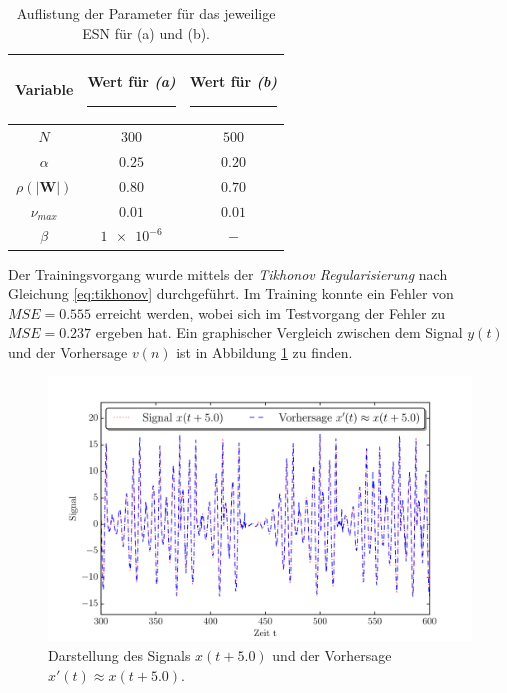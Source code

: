 \begin{table}[H]
	\centering
	\captionsetup{width=0.9\linewidth}
		\begin{tabular}{|c|c|c|}
		\rule[-1ex]{0pt}{3.5ex} Variable & \hspace{4ex} Wert für \textit{(a)} \rule[-1ex]{4ex}{0pt} & \hspace{4ex} Wert für \textit{(b)} \rule[-1ex]{4ex}{0pt}\\ 
		\hline \hline 
		\rule[-1ex]{0pt}{3.5ex} $N$ & $300$ & $500$ \\ 
		\hline 
		\rule[-1ex]{0pt}{3.5ex} $\alpha$ & $0.25$ & $0.20$ \\ 
		\hline 
		\rule[-1ex]{0pt}{3.5ex} $\rho(|\mathbf{W}|)$ & $0.80$ & $0.70$\\ 
		\hline 
		\rule[-1ex]{0pt}{3.5ex} $\nu_{max}$ & $0.01$ & $0.01$\\ 
		\hline 
		\rule[-1ex]{0pt}{3.5ex} $\beta$ & $\num{1e-6}$ & $-$\\ 
		\hline 
	\end{tabular} 
	\caption{Auflistung der Parameter für das jeweilige \textsc{ESN} für (a) und (b).}
	\label{tab:application_roessler}
\end{table}

Der Trainingsvorgang wurde mittels der \textit{Tikhonov Regularisierung} nach Gleichung \ref{eq:tikhonov} durchgeführt. Im Training konnte ein Fehler von $MSE = 0.555 	$ erreicht werden, wobei sich im Testvorgang der Fehler zu $MSE = 0.237$ ergeben hat. Ein graphischer Vergleich zwischen dem Signal $y(t)$ und der Vorhersage $v(n)$ ist in Abbildung \ref{fig:application_roessler_a} zu finden.

\vspace{-3.75ex}
\begin{figure}[H]
    \centering
    \includegraphics[width = 0.9 \textwidth]{figures/roessler_pred50.pdf}
    \caption{Darstellung des Signals $x(t+5.0)$ und der Vorhersage $x'(t) \approx x(t+5.0)$.}
    \label{fig:application_roessler_a}
\end{figure}



